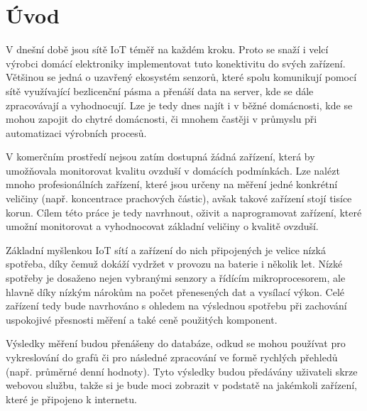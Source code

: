 \chapter*{Úvod}
{}

V dnešní době jsou sítě IoT téměř na každém kroku. Proto se snaží i velcí výrobci domácí elektroniky implementovat tuto konektivitu do svých zařízení. Většinou se jedná o uzavřený ekosystém senzorů, které spolu komunikují pomocí sítě využívající bezlicenční pásma a přenáší data na server, kde se dále zpracovávají a vyhodnocují. Lze je tedy dnes najít i v běžné domácnosti, kde se mohou zapojit do chytré domácnosti, či mnohem častěji v průmyslu při automatizaci výrobních procesů.

V komerčním prostředí nejsou zatím dostupná žádná zařízení, která by umožňovala monitorovat kvalitu ovzduší v domácích podmínkách. Lze nalézt mnoho profesionálních zařízení, které jsou určeny na měření jedné konkrétní veličiny (např. koncentrace prachových částic), avšak takové zařízení stojí tisíce korun. Cílem této práce je tedy navrhnout, oživit a naprogramovat zařízení, které umožní monitorovat a vyhodnocovat základní veličiny o kvalitě ovzduší.

Základní myšlenkou IoT sítí a zařízení do nich připojených je velice nízká spotřeba, díky čemuž dokáží vydržet v provozu na baterie i několik let. Nízké spotřeby je dosaženo nejen vybranými senzory a řídícím mikroprocesorem, ale hlavně díky nízkým nárokům na počet přenesených dat a vysílací výkon. Celé zařízení tedy bude navrhováno s ohledem na výslednou spotřebu při zachování uspokojivé přesnosti měření a také ceně použitých komponent.

Výsledky měření budou přenášeny do databáze, odkud se mohou používat pro vykreslování do grafů či pro následné zpracování ve formě rychlých přehledů (např. průměrné denní hodnoty). Tyto výsledky budou předávány uživateli skrze webovou službu, takže si je bude moci zobrazit v podstatě na jakémkoli zařízení, které je připojeno k internetu.